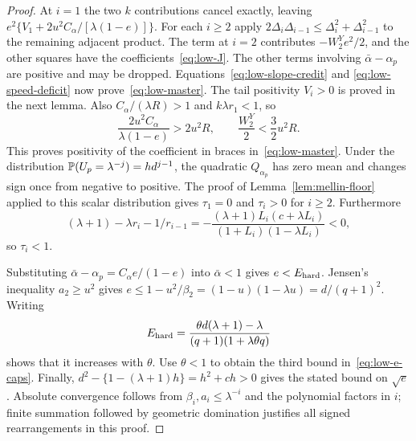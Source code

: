 \begin{proof}
At $i=1$ the two $k$ contributions cancel exactly, leaving
$e^2\{V_1+2u^2C_\alpha/[\lambda(1-e)]\}$.
For each $i\ge2$ apply
$2\Delta_i\Delta_{i-1}\le\Delta_i^2+\Delta_{i-1}^2$ to the
remaining adjacent product. The term at $i=2$ contributes
$-W_2^Y e^2/2$, and the other squares have
the coefficients~\eqref{eq:low-J}.  The other terms involving
$\bar\alpha-\alpha_p$ are positive and may be dropped.
Equations~\eqref{eq:low-slope-credit} and
\eqref{eq:low-speed-deficit} now prove~\eqref{eq:low-master}.
The tail positivity $V_i>0$ is proved in the next lemma.  Also
$C_\alpha/(\lambda R)>1$ and $k\lambda r_1<1$, so
\[
 \frac{2u^2C_\alpha}{\lambda(1-e)}>2u^2R,
 \qquad \frac{W_2^Y}{2}<\frac32u^2R.
\]
This proves positivity of the coefficient in braces in~\eqref{eq:low-master}.
Under the distribution $\mathbb P(U_p=\lambda^{-j})=hd^{j-1}$, the quadratic
$Q_{\alpha_p}$ has zero mean and changes sign once from negative
to positive. The proof of Lemma~\ref{lem:mellin-floor} applied to this
scalar distribution gives $\tau_1=0$ and $\tau_i>0$ for $i\ge2$.
Furthermore
\[
 (\lambda+1)-\lambda r_i-1/r_{i-1}
 =-\frac{(\lambda+1)L_i(c+\lambda L_i)}
          {(1+L_i)(1-\lambda L_i)}<0,
\]
so $\tau_i<1$.

Substituting $\bar\alpha-\alpha_p=C_\alpha e/(1-e)$ into $\bar\alpha<1$
gives $e<E_{\rm hard}$. Jensen's inequality $a_2\ge u^2$ gives
$e\le1-u^2/\beta_2=(1-u)(1-\lambda u)=d/(q+1)^2$.
Writing
\[
 E_{\rm hard}=\frac{\theta d(\lambda+1)-\lambda}
                   {(q+1)(1+\lambda\theta q)}
\]
shows that it increases with $\theta$.  Use $\theta<1$ to obtain
the third bound in~\eqref{eq:low-e-caps}.
Finally, $d^2-\{1-(\lambda+1)h\}=h^2+ch>0$ gives the stated
bound on $\sqrt e$.  Absolute convergence follows from
$\beta_i,a_i\le\lambda^{-i}$ and the polynomial factors in $i$;
finite summation followed by geometric domination justifies all
signed rearrangements in this proof.
\end{proof}

